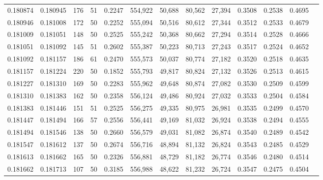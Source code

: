 \begin{tabular}{rrrrrrrrrrrrr}
0.180874 & 0.180945 &   176 &  51 &                                     0.2247 & 554,922 &  50,688 &  80,562 &  27,394 & 0.3508 & 0.2538 & 0.4695 \\
0.180946 & 0.181008 &   172 &  50 &                                     0.2252 & 555,094 &  50,516 &  80,612 &  27,344 & 0.3512 & 0.2533 & 0.4679 \\
0.181009 & 0.181051 &   148 &  50 &                                     0.2525 & 555,242 &  50,368 &  80,662 &  27,294 & 0.3514 & 0.2528 & 0.4666 \\
0.181051 & 0.181092 &   145 &  51 &                                     0.2602 & 555,387 &  50,223 &  80,713 &  27,243 & 0.3517 & 0.2524 & 0.4652 \\
0.181092 & 0.181157 &   186 &  61 &                                     0.2470 & 555,573 &  50,037 &  80,774 &  27,182 & 0.3520 & 0.2518 & 0.4635 \\
0.181157 & 0.181224 &   220 &  50 &                                     0.1852 & 555,793 &  49,817 &  80,824 &  27,132 & 0.3526 & 0.2513 & 0.4615 \\
0.181227 & 0.181310 &   169 &  50 &                                     0.2283 & 555,962 &  49,648 &  80,874 &  27,082 & 0.3530 & 0.2509 & 0.4599 \\
0.181310 & 0.181383 &   162 &  50 &                                     0.2358 & 556,124 &  49,486 &  80,924 &  27,032 & 0.3533 & 0.2504 & 0.4584 \\
0.181383 & 0.181446 &   151 &  51 &                                     0.2525 & 556,275 &  49,335 &  80,975 &  26,981 & 0.3535 & 0.2499 & 0.4570 \\
0.181447 & 0.181494 &   166 &  57 &                                     0.2556 & 556,441 &  49,169 &  81,032 &  26,924 & 0.3538 & 0.2494 & 0.4555 \\
0.181494 & 0.181546 &   138 &  50 &                                     0.2660 & 556,579 &  49,031 &  81,082 &  26,874 & 0.3540 & 0.2489 & 0.4542 \\
0.181547 & 0.181612 &   137 &  50 &                                     0.2674 & 556,716 &  48,894 &  81,132 &  26,824 & 0.3543 & 0.2485 & 0.4529 \\
0.181613 & 0.181662 &   165 &  50 &                                     0.2326 & 556,881 &  48,729 &  81,182 &  26,774 & 0.3546 & 0.2480 & 0.4514 \\
0.181662 & 0.181713 &   107 &  50 &                                     0.3185 & 556,988 &  48,622 &  81,232 &  26,724 & 0.3547 & 0.2475 & 0.4504 \\

\end{tabular}
